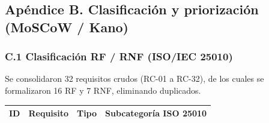 \documentclass[11pt,a4paper]{article}
\begin{document}
	
	
	\subsection{Apéndice B. Clasificación y priorización (MoSCoW / Kano)}
	
	\subsubsection{C.1 Clasificación RF / RNF (ISO/IEC 25010)}
	
	Se consolidaron 32 requisitos crudos (RC-01 a RC-32), de los cuales se formalizaron 16 RF y 7 RNF, eliminando duplicados.
	
	\begin{longtable}{p{} p{} p{} p{}}
		
		\toprule
		\textbf{ID} &
		\textbf{Requisito} &
		\textbf{Tipo} &
		\textbf{Subcategoría 
			ISO 25010} \\
		\midrule
		\endhead
		

\end{longtable}
\end{document}

